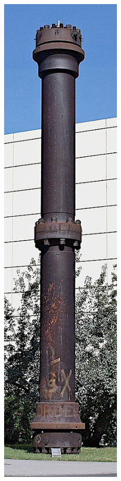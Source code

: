 \documentclass[10pt]{beamer}
\begin{document}
\begin{frame}
\begin{columns}
  \includegraphics[width=0.9\textwidth]{fig/campus_hochdruck_reaktor.png}
  \end{columns}
\end{frame}
\end{document}

